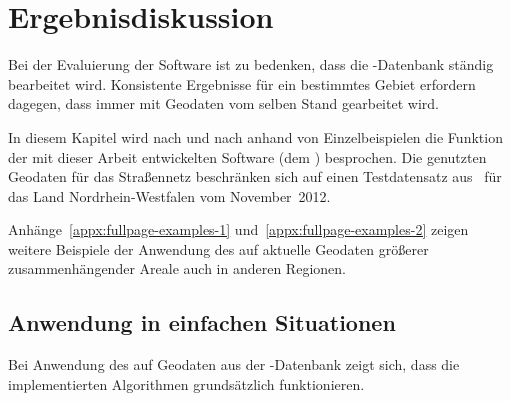 \documentclass[../main/thesis.tex]{subfiles}
\begin{document}
\chapter{Ergebnisdiskussion}
\label{ch:result}


Bei der Evaluierung der Software ist zu bedenken, dass die \osm-Datenbank ständig bearbeitet wird.
Konsistente Ergebnisse für ein bestimmtes Gebiet erfordern dagegen, dass immer mit Geodaten vom selben Stand gearbeitet wird.

In diesem Kapitel wird nach und nach anhand von Einzelbeispielen die Funktion der mit dieser Arbeit entwickelten Software (dem ) besprochen.
Die genutzten Geodaten für das Straßennetz beschränken sich auf einen Testdatensatz aus \osm\ für das Land Nordrhein-Westfalen vom November~2012.

Anhänge~\ref{appx:fullpage-examples-1} und~\ref{appx:fullpage-examples-2} zeigen weitere Beispiele der Anwendung des  auf aktuelle Geodaten größerer zusammenhängender Areale auch in anderen Regionen.



\section{Anwendung in einfachen Situationen}
\label{ch:result-trivial}

Bei Anwendung des  auf Geodaten aus der \osm-Datenbank zeigt sich, dass die implementierten Algorithmen grundsätzlich funktionieren.

\end{document}
